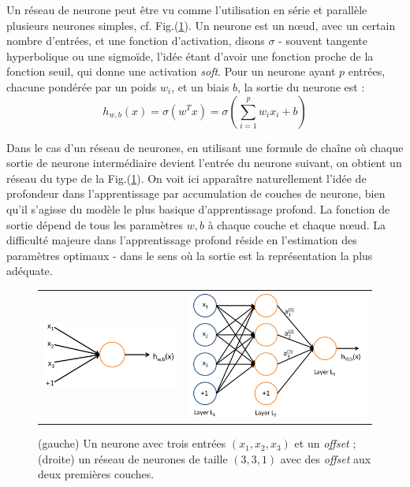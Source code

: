 \documentclass[10pt,a4paper]{article}
\begin{document}
Un réseau de neurone peut être vu comme l'utilisation en série et parallèle plusieurs neurones simples, cf. Fig.(\ref{fig1}). Un neurone est un nœud, avec un certain nombre d'entrées, et une fonction d'activation, disons $\sigma$ - souvent tangente hyperbolique ou une sigmoïde, l'idée étant d'avoir une fonction proche de la fonction seuil, qui donne une activation \emph{soft}. Pour un neurone ayant $p$ entrées, chacune pondérée par un poids $w_i$, et un biais $b$, la sortie du neurone est :
\begin{equation}
h_{w,b}(x)=\sigma(w^Tx)=\sigma\left(\sum_{i=1}^p w_i x_i + b\right)
\end{equation}

Dans le cas d'un réseau de neurones, en utilisant une formule de chaîne où chaque sortie de neurone intermédiaire devient l'entrée du neurone suivant, on obtient un réseau du type de la Fig.(\ref{fig1}). On voit ici apparaître naturellement l'idée de profondeur dans l'apprentissage par accumulation de couches de neurone, bien qu'il s'agisse du modèle le plus basique d'apprentissage profond. La fonction de sortie dépend de tous les paramètres $w,b$ à chaque couche et chaque nœud. La difficulté majeure dans l'apprentissage profond réside en l'estimation des paramètres optimaux - dans le sens où la sortie est la représentation la plus adéquate.

\begin{figure}[ht!]
\centering
\begin{tabular}{cc}
\includegraphics[width = .5\columnwidth]{fig/SingleNeuron.png} &
\includegraphics[width = .5\columnwidth]{fig/Network331.png} 
\end{tabular}
\caption{(gauche) Un neurone avec trois entrées $(x_1,x_2,x_3)$ et un \emph{offset} ; (droite) un réseau de neurones de taille $(3,3,1)$ avec des \emph{offset} aux deux premières couches.}
\label{fig1}
\end{figure}
\end{document}
